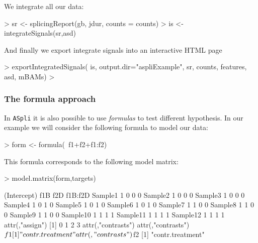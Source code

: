 \documentclass{article}
\begin{document}
We integrate all our data:

\begin{Schunk}
\begin{Sinput}
> sr      <- splicingReport(gb, jdur, counts = counts)
> is      <- integrateSignals(sr,asd)
\end{Sinput}
\end{Schunk}

And finally we export integrate signals into an interactive HTML page

\begin{Schunk}
\begin{Sinput}
> exportIntegratedSignals( is, output.dir="aspliExample", 
                          sr, counts, features, asd, mBAMs)
> 
\end{Sinput}
\end{Schunk}

\subsubsection{The formula approach}\label{sec:formula}
In \texttt{ASpli} it is also possible to use {\em formulas} to test different hypothesis.
In our example we will consider the following formula to model our data:

\begin{Schunk}
\begin{Sinput}
>  form <- formula(~f1+f2+f1:f2)
\end{Sinput}
\end{Schunk}

This formula corresponds to the following model matrix:

\begin{Schunk}
\begin{Sinput}
>  model.matrix(form,targets)
\end{Sinput}
\begin{Soutput}
         (Intercept) f1B f2D f1B:f2D
Sample1            1   0   0       0
Sample2            1   0   0       0
Sample3            1   0   0       0
Sample4            1   0   1       0
Sample5            1   0   1       0
Sample6            1   0   1       0
Sample7            1   1   0       0
Sample8            1   1   0       0
Sample9            1   1   0       0
Sample10           1   1   1       1
Sample11           1   1   1       1
Sample12           1   1   1       1
attr(,"assign")
[1] 0 1 2 3
attr(,"contrasts")
attr(,"contrasts")$f1
[1] "contr.treatment"

attr(,"contrasts")$f2
[1] "contr.treatment"
\end{Soutput}
\end{Schunk}
\end{document}
